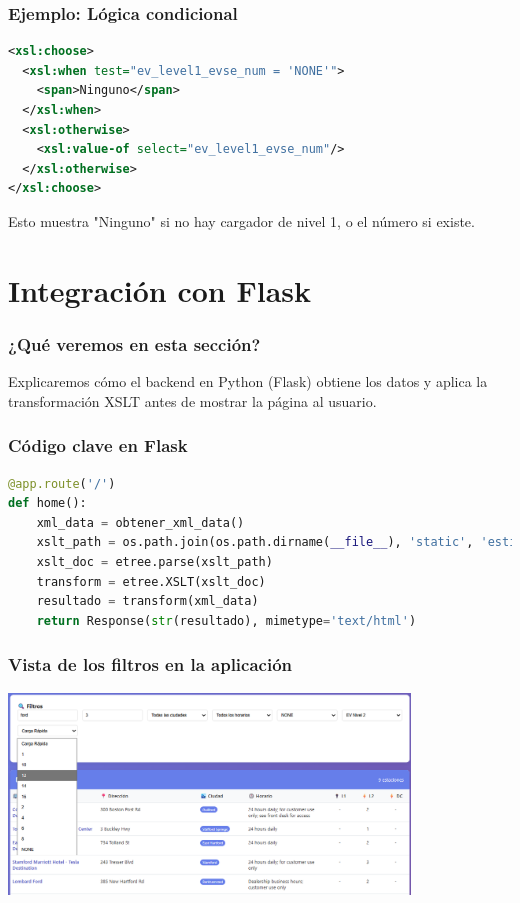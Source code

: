\documentclass{beamer}
\begin{document}
\begin{frame}[fragile]
\frametitle{Ejemplo: Lógica condicional}
\begin{lstlisting}[language=XML]
<xsl:choose>
  <xsl:when test="ev_level1_evse_num = 'NONE'">
    <span>Ninguno</span>
  </xsl:when>
  <xsl:otherwise>
    <xsl:value-of select="ev_level1_evse_num"/>
  </xsl:otherwise>
</xsl:choose>
\end{lstlisting}
Esto muestra "Ninguno" si no hay cargador de nivel 1, o el número si existe.
\end{frame}

\section{Integración con Flask}

\begin{frame}
\frametitle{¿Qué veremos en esta sección?}
Explicaremos cómo el backend en Python (Flask) obtiene los datos y aplica la transformación XSLT antes de mostrar la página al usuario.
\end{frame}

\begin{frame}[fragile]
\frametitle{Código clave en Flask}
  \begin{lstlisting}[language=Python]
@app.route('/')
def home():
    xml_data = obtener_xml_data()
    xslt_path = os.path.join(os.path.dirname(__file__), 'static', 'estilos.xslt')
    xslt_doc = etree.parse(xslt_path)
    transform = etree.XSLT(xslt_doc)
    resultado = transform(xml_data)
    return Response(str(resultado), mimetype='text/html')
  \end{lstlisting}
\end{frame}

\begin{frame}
\frametitle{Vista de los filtros en la aplicación}
\begin{center}
\includegraphics[width=0.8\textwidth]{Imagenes/filtros.png} %
\end{center}
\end{frame}
\end{document}
